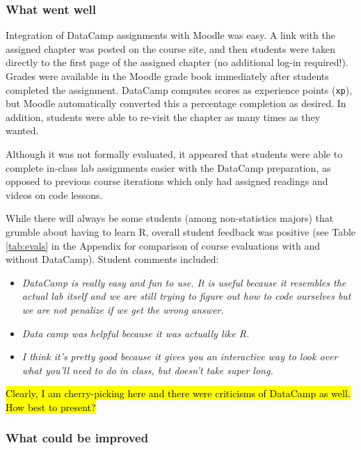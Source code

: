 \documentclass{tise_style_doi}
\begin{document}
\subsubsection{What went well}

Integration of DataCamp assignments with Moodle was easy.  A link with the assigned
chapter was posted on the course site, and then students were taken directly to the
first page of the assigned chapter (no additional log-in required!). Grades were
available in the Moodle grade book immediately after students completed the assignment.
DataCamp computes scores as experience points (\texttt{xp}), but Moodle automatically
converted this a percentage completion as desired.  In addition, students were
able to re-visit the chapter as many times as they wanted.

Although it was not formally evaluated, it appeared that students were able to complete
in-class lab assignments easier with the DataCamp preparation, as opposed to previous
course iterations which only had assigned readings and videos on code lessons.

While there will always be some students (among non-statistics majors) that grumble about
having to learn R, overall student feedback was positive (see Table \ref{tab:evals}
in the Appendix for comparison of course evaluations with and without DataCamp).
Student comments included:
\begin{itemize}
\item \emph{DataCamp is really easy and fun to use. It is useful because it resembles the actual lab itself and we are still trying to figure out how to code ourselves but we are not penalize if we get the wrong answer.}
\item \emph{Data camp was helpful because it was actually like R.}
\item \emph{I think it's pretty good because it gives you an interactive way to look over what you'll need to do in class, but doesn't take super long. }
\end{itemize}
\hl{Clearly, I am cherry-picking here and there were criticisms of DataCamp as well.
How best to present?}

\subsubsection{What could be improved}
\end{document}
